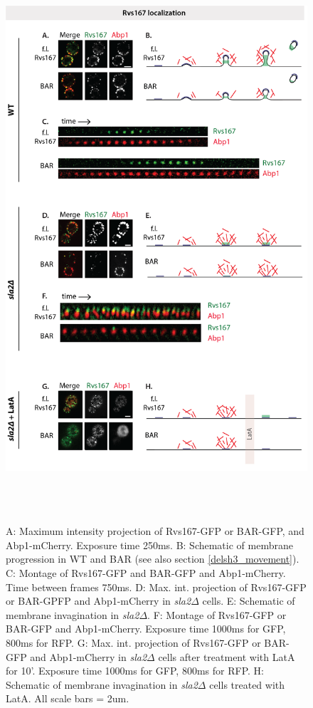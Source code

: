  
	\begin{figure}[H]
	\centering
	\includegraphics[width=21cm,height=21cm,keepaspectratio]{figures/results_final/sla2_del_final7}
	\caption [Localization of the Rvs167 BAR domain]
{A: Maximum intensity projection of Rvs167-GFP or BAR-GFP, and Abp1-mCherry. Exposure time 250ms. B: Schematic of membrane progression in WT and BAR  (see also section \ref{delsh3_movement}).
C: Montage of Rvs167-GFP and BAR-GFP and Abp1-mCherry. Time between frames 750ms.
D: Max. int. projection of Rvs167-GFP or BAR-GPFP and Abp1-mCherry in \textit{sla2$\Delta$} cells. 
E: Schematic of membrane invagination in  \textit{sla2$\Delta$}. F: Montage of Rvs167-GFP or BAR-GFP and Abp1-mCherry. Exposure time 1000ms for GFP, 800ms for RFP. 
G: Max. int. projection of Rvs167-GFP or BAR-GFP and Abp1-mCherry in \textit{sla2$\Delta$} cells after treatment with LatA for 10’. Exposure time 1000ms for GFP, 800ms for RFP. H: Schematic of membrane invagination in \textit{sla2$\Delta$} cells treated with LatA. 
All scale bars = 2um.
	\label{fig2_sla2del}}
	\end{figure}

